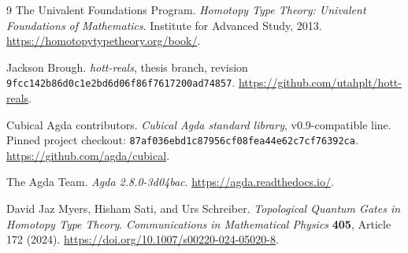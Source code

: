 \begin{thebibliography}{9}
The Univalent Foundations Program.
\newblock \emph{Homotopy Type Theory: Univalent Foundations of Mathematics}.
\newblock Institute for Advanced Study, 2013.
\newblock \url{https://homotopytypetheory.org/book/}.

Jackson Brough.
\newblock \emph{hott-reals}, thesis branch, revision
\texttt{9fcc142b86d0c1e2bd6d06f86f7617200ad74857}.
\newblock \url{https://github.com/utahplt/hott-reals}.

Cubical Agda contributors.
\newblock \emph{Cubical Agda standard library}, v0.9-compatible line.
\newblock Pinned project checkout:
\texttt{87af036ebd1c87956cf08fea44e62c7cf76392ca}.
\newblock \url{https://github.com/agda/cubical}.

The Agda Team.
\newblock \emph{Agda 2.8.0-3d04bac}.
\newblock \url{https://agda.readthedocs.io/}.

David Jaz Myers, Hisham Sati, and Urs Schreiber.
\newblock \emph{Topological Quantum Gates in Homotopy Type Theory}.
\newblock \emph{Communications in Mathematical Physics} \textbf{405},
Article 172 (2024).
\newblock \url{https://doi.org/10.1007/s00220-024-05020-8}.
\end{thebibliography}

